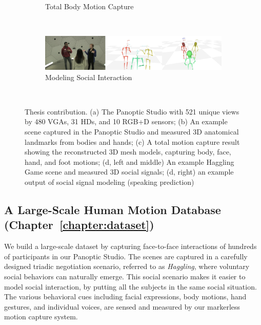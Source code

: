 \begin{figure}[t]
\begin{subfigure}{\textwidth}
		\caption{Total Body Motion Capture}
	\end{subfigure}\\
	\vspace{2pt}
	\begin{subfigure}{\textwidth}
		\includegraphics[width=\textwidth]{figures/teaser_part4}  
		\caption{Modeling Social Interaction}
	\end{subfigure}\\
	\caption{Thesis contribution. (a) The Panoptic Studio with 521 unique views by 480 VGAs, 31 HDs, and 10 RGB+D sensors; (b) An example scene captured in the Panoptic Studio and measured 3D anatomical landmarks from bodies and hands; (c) A total motion capture result showing the reconstructed 3D mesh models, capturing body, face, hand, and foot motions; (d, left and middle) An example Haggling Game scene and measured 3D social signals; (d, right) an example output of social signal modeling (speaking prediction)\label{fig:teaser}}	
\end{figure}
%

\subsection{A Large-Scale Human Motion Database (Chapter~\ref{chapter:dataset})  }
We build a large-scale dataset by capturing face-to-face interactions of hundreds of participants in our Panoptic Studio. The scenes are captured in a carefully designed triadic negotiation scenario, referred to as \emph{Haggling}, where voluntary social behaviors can naturally emerge. This social scenario makes it easier to model social interaction, by putting all the subjects in the same social situation. The various behavioral cues including facial expressions, body motions, hand gestures, and individual voices, are sensed and measured by our markerless motion capture system. 

